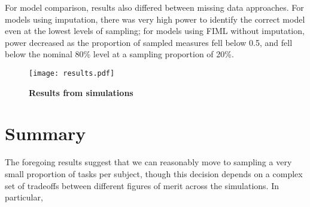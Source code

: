\documentclass[11pt, oneside]{article}   	%
\begin{document}
For model comparison, results also differed between missing data approaches. For models using imputation, there was very high power to identify the correct model even at the lowest levels of sampling; for models using FIML without imputation, power decreased as the proportion of sampled measures fell below 0.5, and fell below the nominal 80\% level at a sampling proportion of 20\%.  

\begin{figure}[!h]
\caption{\textbf{Results from simulations}}
\centering
\texttt{[image: results.pdf]}
\label{fig:results}
\end{figure}

\section{Summary}
The foregoing results suggest that we can reasonably move to sampling a very small proportion of tasks per subject, though this decision depends on a complex set of tradeoffs between different figures of merit across the simulations.  In particular, 
\end{document}
